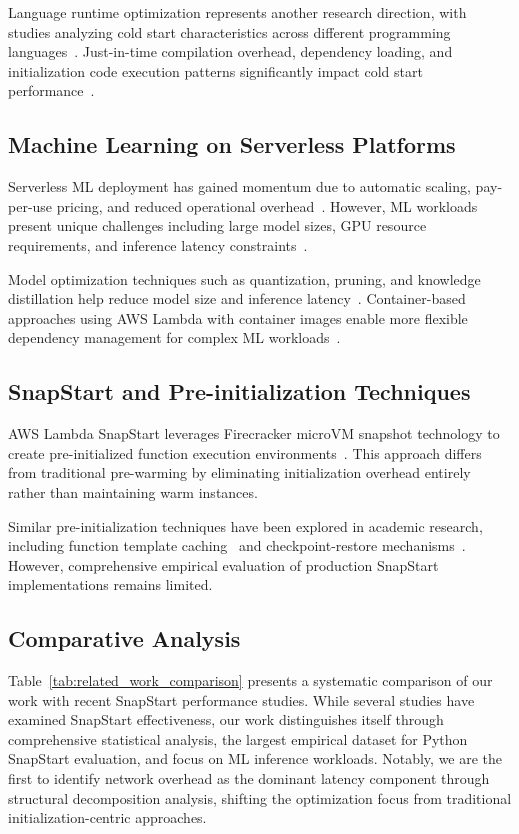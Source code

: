 \documentclass[conference]{IEEEtran}
\begin{document}
Language runtime optimization represents another research direction, with studies analyzing cold start characteristics across different programming languages~\cite{runtime-comparison}. Just-in-time compilation overhead, dependency loading, and initialization code execution patterns significantly impact cold start performance~\cite{jit-analysis}.

\subsection{Machine Learning on Serverless Platforms}
Serverless ML deployment has gained momentum due to automatic scaling, pay-per-use pricing, and reduced operational overhead~\cite{serverless-ml-deployment}. However, ML workloads present unique challenges including large model sizes, GPU resource requirements, and inference latency constraints~\cite{ml-serverless-challenges}.

Model optimization techniques such as quantization, pruning, and knowledge distillation help reduce model size and inference latency~\cite{model-optimization}. Container-based approaches using AWS Lambda with container images enable more flexible dependency management for complex ML workloads~\cite{lambda-containers}.

\subsection{SnapStart and Pre-initialization Techniques}
AWS Lambda SnapStart leverages Firecracker microVM snapshot technology to create pre-initialized function execution environments~\cite{firecracker-snapshots}. This approach differs from traditional pre-warming by eliminating initialization overhead entirely rather than maintaining warm instances.

Similar pre-initialization techniques have been explored in academic research, including function template caching~\cite{template-caching} and checkpoint-restore mechanisms~\cite{checkpoint-restore}. However, comprehensive empirical evaluation of production SnapStart implementations remains limited.

\subsection{Comparative Analysis}
Table~\ref{tab:related_work_comparison} presents a systematic comparison of our work with recent SnapStart performance studies. While several studies have examined SnapStart effectiveness, our work distinguishes itself through comprehensive statistical analysis, the largest empirical dataset for Python SnapStart evaluation, and focus on ML inference workloads. Notably, we are the first to identify network overhead as the dominant latency component through structural decomposition analysis, shifting the optimization focus from traditional initialization-centric approaches.
\end{document}
